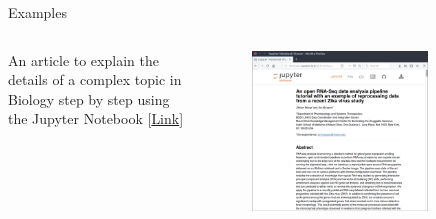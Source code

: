 \documentclass[11pt,t]{beamer}
\begin{document}
\begin{frame}[fragile]{Examples}  

	\begin{columns}[t]
		\begin{column}{.3\textwidth}
		An article to explain the details of a complex topic in Biology step by step using the Jupyter Notebook [\href{http://nbviewer.jupyter.org/github/maayanlab/Zika-RNAseq-Pipeline/blob/master/Zika.ipynb}{Link}]
	
 
		\end{column}
		\begin{column}{.7\textwidth}
			\vspace{-55pt}
			\begin{figure}
			\centering
			\includegraphics[width=0.80\textwidth]{jupyter_ex_rna}
			
			\end{figure}
		\end{column}
	\end{columns}	
		
\end{frame}
\end{document}
